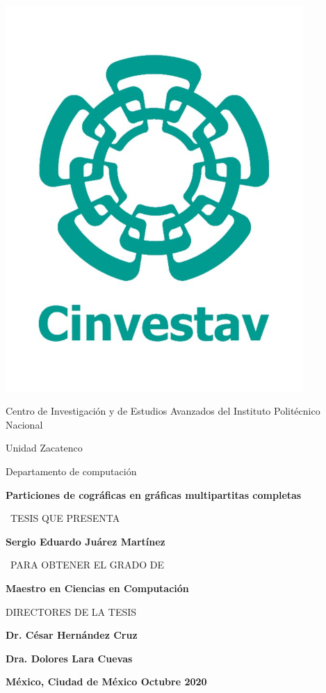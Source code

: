 \thispagestyle{empty}

\begin{minipage}{0.15\textwidth}
	\includegraphics[width=0.85\textwidth]{imagen/cinvestavlogo.pdf}
\end{minipage}%
\begin{minipage}{0.90\textwidth}
\begin{center}
	 \sc Centro de Investigación y de Estudios Avanzados\newline
	           del Instituto Politécnico Nacional\newline
\end{center}
\end{minipage}

\centerline{\sc Unidad Zacatenco}
\centerline{\sc Departamento de computación}

\begin{center}
\Large \bf
Particiones de cográficas en gráficas multipartitas completas
\end{center}

\centerline{ \ TESIS QUE PRESENTA}
\vspace{0.3cm}
\centerline{\large \bf Sergio Eduardo Juárez Martínez}
\vspace{1cm}
\centerline{ \ PARA OBTENER EL GRADO DE}
\vspace{0.3cm}
\centerline{\large \bf Maestro en Ciencias en Computación}
\vspace{1.5cm}
\centerline{  DIRECTORES DE LA TESIS}
\vspace{0.3cm}
\centerline{\large \bf Dr. César Hernández Cruz}
\centerline{\large \bf Dra. Dolores Lara Cuevas}
 
\vspace{2cm}
{\large \bf México, Ciudad de México \hfill Octubre 2020}